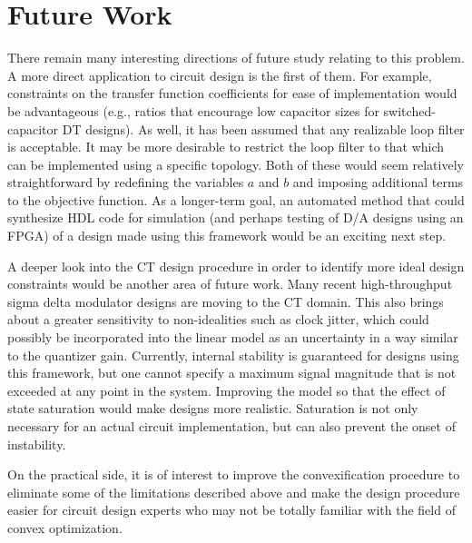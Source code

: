 \section{Future Work}
\label{sec:conclusions-future}

There remain many interesting directions of future study relating to this problem. A more direct application to circuit design is the first of them. For example, constraints on the transfer function coefficients for ease of implementation would be advantageous (e.g., ratios that encourage low capacitor sizes for switched-capacitor \gls{DT} designs). As well, it has been assumed that any realizable loop filter is acceptable. It may be more desirable to restrict the loop filter to that which can be implemented using a specific topology. Both of these would seem relatively straightforward by redefining the variables $a$ and $b$ and imposing additional terms to the objective function. As a longer-term goal, an automated method that could synthesize \gls{HDL} code for simulation (and perhaps testing of \gls{D/A} designs using an \gls{FPGA}) of a design made using this framework would be an exciting next step.

A deeper look into the \gls{CT} design procedure in order to identify more ideal design constraints would be another area of future work. Many recent high-throughput sigma delta modulator designs are moving to the \gls{CT} domain. This also brings about a greater sensitivity to non-idealities such as clock jitter, which could possibly be incorporated into the linear model as an uncertainty in a way similar to the quantizer gain. Currently, internal stability is guaranteed for designs using this framework, but one cannot specify a maximum signal magnitude that is not exceeded at any point in the system. Improving the model so that the effect of state saturation would make designs more realistic. Saturation is not only necessary for an actual circuit implementation, but can also prevent the onset of instability.

On the practical side, it is of interest to improve the convexification procedure to eliminate some of the limitations described above and make the design procedure easier for circuit design experts who may not be totally familiar with the field of convex optimization.